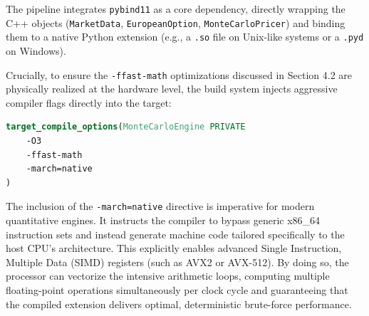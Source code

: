 The pipeline integrates \texttt{pybind11} as a core dependency, directly wrapping the C++ objects (\texttt{MarketData}, \texttt{EuropeanOption}, \texttt{MonteCarloPricer}) and binding them to a native Python extension (e.g., a \texttt{.so} file on Unix-like systems or a \texttt{.pyd} on Windows). 

Crucially, to ensure the \texttt{-ffast-math} optimizations discussed in Section 4.2 are physically realized at the hardware level, the build system injects aggressive compiler flags directly into the target:

\begin{lstlisting}[language=cmake, caption={CMake compiler flags configuration}]
target_compile_options(MonteCarloEngine PRIVATE 
    -O3 
    -ffast-math 
    -march=native
)
\end{lstlisting}

The inclusion of the \texttt{-march=native} directive is imperative for modern quantitative engines. It instructs the compiler to bypass generic x86\_64 instruction sets and instead generate machine code tailored specifically to the host CPU's architecture. This explicitly enables advanced Single Instruction, Multiple Data (SIMD) registers (such as AVX2 or AVX-512). By doing so, the processor can vectorize the intensive arithmetic loops, computing multiple floating-point operations simultaneously per clock cycle and guaranteeing that the compiled extension delivers optimal, deterministic brute-force performance.
